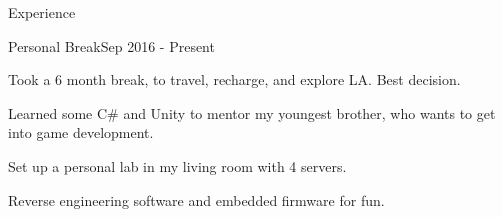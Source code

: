 \documentclass{resume} %
\begin{document}
\begin{rSection}{Experience}

\begin{rSubsection}{Personal Break}{Sep 2016 - Present}{}{}
\item Took a 6 month break, to travel, recharge, and explore LA. Best decision.
\item Learned some C\# and Unity to mentor my youngest brother, who wants to get into game development.
\item Set up a personal lab in my living room with 4 servers.
\item Reverse engineering software and embedded firmware for fun.
\end{rSubsection}



\end{rSection}
\end{document}
